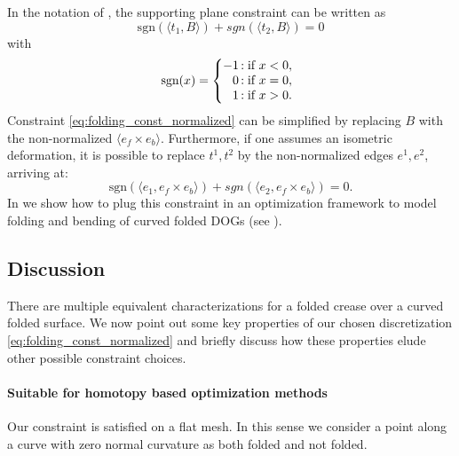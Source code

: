 In the notation of , the supporting plane constraint can be written as
\begin{equation} \label{eq:folding_const_normalized} 
\text{sgn}(\langle t_1,B\rangle) +  {sgn}(\langle t_2,B\rangle) = 0
\end{equation}
with 
\begin{equation} \label{eq:sign}
\text{sgn}(x) = \left\{
     \begin{array}{@{}r@{\thinspace}l}
       -1  &: \text{if } x < 0, \\
       0 &: \text{if } x = 0, \\
       1 &: \text{if } x > 0. \\
     \end{array}
   \right.
\end{equation}
%
Constraint \eqref{eq:folding_const_normalized} can be simplified by replacing $B$ with the non-normalized $\langle e_f \times e_b \rangle$. Furthermore, if one assumes an isometric deformation, it is possible to replace $t^1,t^2$ by the non-normalized edges $e^1,e^2$, arriving at:
\begin{equation} \label{eq:folding_const}
\text{sgn}(\langle e_1,e_f \times e_b \rangle) +  {sgn}(\langle e_2,e_f \times e_b\rangle) = 0.
\end{equation}
In  we show how to plug this constraint in an optimization framework to model folding and bending of curved folded DOGs (see ).

\subsection{Discussion}
There are multiple equivalent characterizations for a folded crease over a curved folded surface. We now point out some key properties of our chosen discretization \eqref{eq:folding_const_normalized} and briefly discuss how these properties elude other possible constraint choices.

\paragraph{Suitable for homotopy based optimization methods} 
Our constraint is satisfied on a flat mesh. In this sense we consider a point along a curve with zero normal curvature as both folded and not folded.
 
